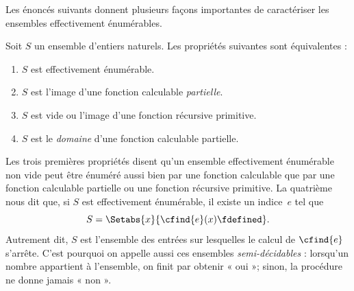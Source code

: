 \documentclass[../../../include/open-logic-section]{subfiles}
\begin{document}

Les énoncés suivants donnent plusieurs façons
importantes de caractériser les ensembles effectivement
énumérables.

\begin{thm}
Soit $S$ un ensemble d'entiers naturels. Les propriétés
suivantes sont équivalentes :
\begin{enumerate}
\item{} $S$ est effectivement énumérable.
\item{} $S$ est l'image d'une fonction
  calculable \emph{partielle}.
\item{} $S$ est vide ou l'image
  d'une fonction récursive primitive.
\item{} $S$ est le \emph{domaine}
  d'une fonction calculable partielle.
\end{enumerate}
\end{thm}

\begin{explain}
Les trois premières propriétés disent qu'un ensemble
effectivement énumérable non vide peut être énuméré
aussi bien par une fonction calculable que par une
fonction calculable partielle ou une fonction récursive
primitive. La quatrième nous dit que, si $S$ est
effectivement énumérable, il existe un indice~$e$ tel que
\[
S = \Setabs{x}{\cfind{e}(x) \fdefined}.
\]
Autrement dit, $S$ est l'ensemble des entrées sur
lesquelles le calcul de $\cfind{e}$ s'arrête. C'est
pourquoi on appelle aussi ces ensembles
\emph{semi-décidables} : lorsqu'un nombre appartient à
l'ensemble, on finit par obtenir « oui »; sinon,
la procédure ne donne jamais « non ».
\end{explain}
\end{document}

